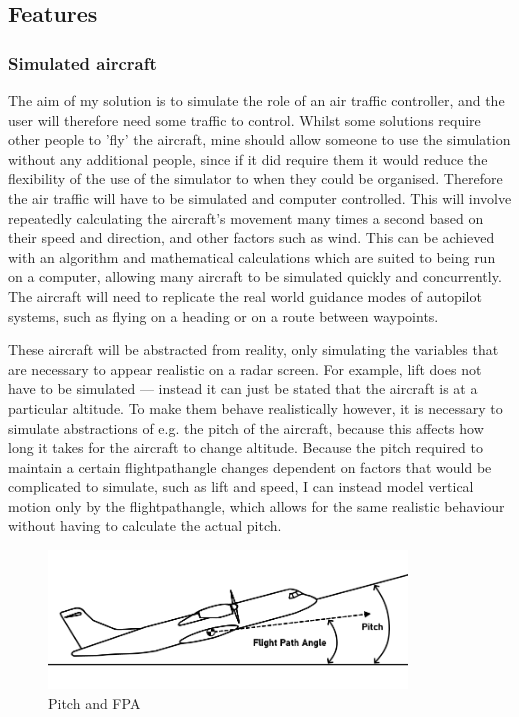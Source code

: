 \documentclass{article}
\begin{document}
\subsection{Features} \label{essentialfeatures}
\subsubsection{Simulated aircraft}
The aim of my solution is to simulate the role of an air traffic controller, and the user will therefore need some traffic to control.
Whilst some solutions require other people to 'fly' the aircraft, mine should allow someone to use the simulation without any additional people, since if it did require them it would reduce the flexibility of the use of the simulator to when they could be organised.
Therefore the air traffic will have to be simulated and computer controlled.
This will involve repeatedly calculating the aircraft's movement many times a second based on their speed and direction, and other factors such as wind.
This can be achieved with an algorithm and mathematical calculations which are suited to being run on a computer, allowing many aircraft to be simulated quickly and concurrently.
The aircraft will need to replicate the real world guidance modes of autopilot systems, such as flying on a heading or on a route between waypoints.

These aircraft will be abstracted from reality, only simulating the variables that are necessary to appear realistic on a radar screen.
For example, lift does not have to be simulated --- instead it can just be stated that the aircraft is at a particular altitude.
To make them behave realistically however, it is necessary to simulate abstractions of e.g.
the pitch of the aircraft, because this affects how long it takes for the aircraft to change altitude.
Because the pitch required to maintain a certain \gls{flightpathangle} changes dependent on factors that would be complicated to simulate, such as lift and speed, I can instead model vertical motion only by the \gls{flightpathangle}, which allows for the same realistic behaviour without having to calculate the actual pitch.
\begin{figure}[H]
\centering
\includegraphics[width=0.85\textwidth]{diagrams/pitchfpa.png}
\caption{\label{fig:pitchfpa}Pitch and FPA}
\end{figure}
\end{document}
